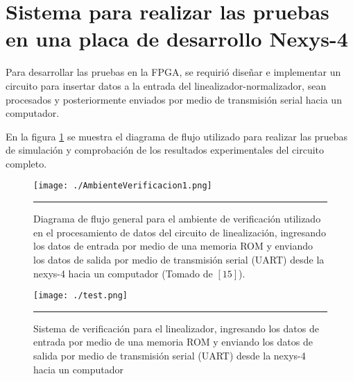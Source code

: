 \section{Sistema para realizar las pruebas en una placa de desarrollo Nexys-4}

Para desarrollar las pruebas en la FPGA, se requirió diseñar e implementar un circuito para insertar datos a la entrada del linealizador-normalizador, sean procesados y posteriormente enviados por medio de transmisión serial hacia un computador.  

En la figura \ref{fig:flujo-test} se muestra el diagrama de flujo utilizado para realizar las pruebas de simulación y comprobación de los resultados experimentales del circuito completo. 

\begin{figure}[H]
  \centering
    \texttt{[image: ./AmbienteVerificacion1.png]}
    \rule{35em}{0.5pt}
  \caption[Diagrama de flujo general para el ambiente de verificación utilizado en el procesamiento de datos del circuito de linealización, ingresando los datos de entrada por medio de una memoria ROM y enviando los datos de salida por medio de transmisión serial (UART) desde la nexys-4 hacia un computador]{Diagrama de flujo general para el ambiente de verificación utilizado en el procesamiento de datos del circuito de linealización, ingresando los datos de entrada por medio de una memoria ROM y enviando los datos de salida por medio de transmisión serial (UART) desde la nexys-4 hacia un computador (Tomado de $ [15] $).}
  \label{fig:flujo-test}
\end{figure}


\begin{figure}[H]
  \centering
    \texttt{[image: ./test.png]}
    \rule{35em}{0.5pt}
  \caption[Sistema de verificación para el linealizador, ingresando los datos de entrada por medio de una memoria ROM y enviando los datos de salida por medio de transmisión serial (UART) desde la nexys-4 hacia un computador]{Sistema de verificación para el linealizador, ingresando los datos de entrada por medio de una memoria ROM y enviando los datos de salida por medio de transmisión serial (UART) desde la nexys-4 hacia un computador}
  \label{fig:test}
\end{figure}

